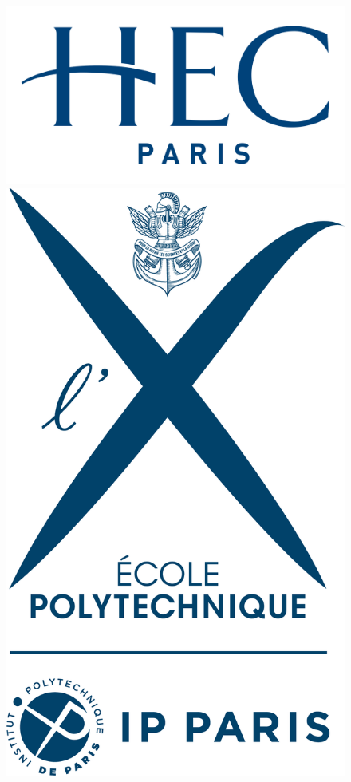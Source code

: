 \documentclass[12pt]{report}
\begin{document}
\begin{titlepage}
\newcommand{\HRule}{\rule{\linewidth}{0.5mm}}
\begin{figure}[!tbp]
  \centering
  {\includegraphics[scale=0.1]{hec_logo.png}} 
  \hfill
  {\includegraphics[scale=0.1]{polytechnique_logo.png}}

\end{figure}
\end{titlepage}
\end{document}
